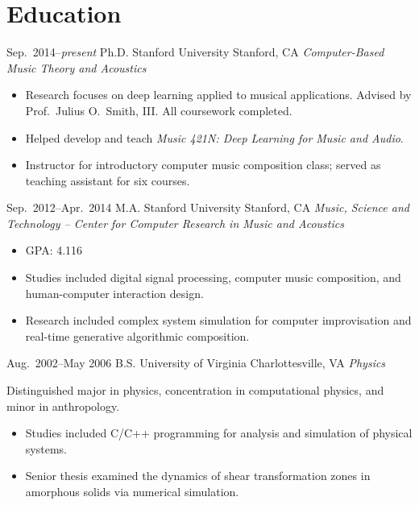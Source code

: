 \documentclass[10pt,letterpaper,roman,final]{moderncv}
\begin{document}
\makecvtitle
\vspace{-22px}

\section{Education} %

\cventry
{Sep.\ 2014--\textit{present}}
{Ph.D.}
{Stanford University}
{Stanford, CA}
{\textit{Computer-Based Music Theory and Acoustics}}
{\begin{itemize}
   \item Research focuses on deep learning applied to musical applications.
         Advised by Prof.\ Julius O.\ Smith, III. All coursework completed.
   \item Helped develop and teach \textit{Music 421N: Deep Learning for
         Music and Audio}.
   \item Instructor for introductory computer music composition class;
         served as teaching assistant for six courses.
 \end{itemize}}

\cventry
{Sep.\ 2012--Apr.\ 2014}
{M.A.}
{Stanford University}
{Stanford, CA}
{\textit{Music, Science and Technology -- Center for Computer Research in Music
 and Acoustics}}
 {\begin{itemize}
   \item GPA: 4.116
   \item Studies included digital signal processing, computer music
         composition, and human-computer interaction design.
   \item Research included complex system simulation for computer
         improvisation and real-time generative algorithmic composition.
 \end{itemize}}

\cventry
{Aug.\ 2002--May 2006}
{B.S.}
{University of Virginia}
{Charlottesville, VA}
{\textit{Physics}}
{Distinguished major in physics, concentration in computational physics, and
 minor in anthropology.
 \begin{itemize}
   \item Studies included C/C++ programming for analysis and simulation of
         physical systems.
   \item Senior thesis examined the dynamics of shear transformation zones in
         amorphous solids via numerical simulation.
 \end{itemize}}
\end{document}
